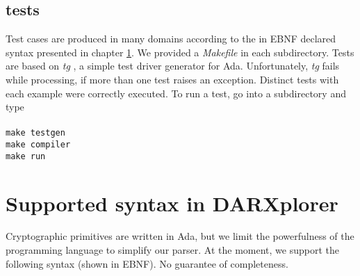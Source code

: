 \documentclass{acmtrans2m}
\begin{document}
\subsection{tests}
Test cases are produced in many domains according to the in EBNF
declared syntax presented in chapter \ref{chapter:syntax}. We provided
a \textit{Makefile} in each subdirectory. Tests are based on \textit{tg} \cite{Spiegel:tg},
a simple test driver generator for Ada. Unfortunately, \textit{tg} fails while processing, 
if more than one test raises an exception. Distinct tests with each example
were correctly executed.
To run a test, go into a subdirectory and type\\ \\
\noindent\hspace*{12mm}%
\texttt{make testgen}\\
\noindent\hspace*{12mm}%
\texttt{make compiler}\\
\noindent\hspace*{12mm}%
\texttt{make run}\\

\section{Supported syntax in DARXplorer}\label{chapter:syntax}
Cryptographic primitives are written in Ada, but we limit the powerfulness of
the programming language to simplify our parser. At the moment,
we support the following syntax (shown in EBNF). No guarantee of completeness.
\end{document}
